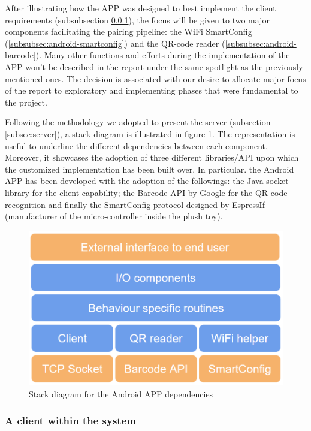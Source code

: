 \medskip
After illustrating how the APP was designed to best implement the client requirements (subsubsection \ref{subsubsec:android-client}), the focus will be given to two major components facilitating the pairing pipeline: the WiFi SmartConfig (\ref{subsubsec:android-smartconfig}) and the QR-code reader (\ref{subsubsec:android-barcode}). Many other functions and efforts during the implementation of the APP won't be described in the report under the same spotlight as the previously mentioned ones. The decision is associated with our desire to allocate major focus of the report to exploratory and implementing phases that were fundamental to the project. 

\newpage
Following the methodology we adopted to present the server (subsection \ref{subsec:server}), a stack diagram is illustrated in figure \ref{fig:SE_stack_android}. The representation is useful to underline the different dependencies between each component. Moreover, it showcases the adoption of three different libraries/API upon which the customized implementation has been built over. In particular. the Android APP has been developed with the adoption of the followings: the Java socket library for the client capability; the Barcode API by Google for the QR-code recognition and finally the SmartConfig protocol designed by EspressIf (manufacturer of the micro-controller inside the plush toy). 

\begin{figure}[ht]
    \centering
    \includegraphics[scale=0.45]{images/SE_android_stack.PNG}
    \caption{Stack diagram for the Android APP dependencies}
    \label{fig:SE_stack_android}
\end{figure}

\subsubsection{A client within the system}
\label{subsubsec:android-client}


